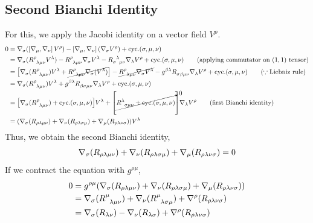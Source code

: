 \subsection{Second Bianchi Identity}
For this, we apply the Jacobi identity on a vector field $V^\rho$. 
\begin{align*}
    0 &= \covd{\sigma}\qty(\comtr{\covd{\mu}}{\covd{\nu}}V^\rho) -\comtr{\covd{\mu}}{\covd{\nu}}(\covd{\sigma}V^\rho) + \mathrm{cyc}. (\sigma, \mu, \nu)\\
    &=\covd{\sigma}(\rie{\rho}{\lambda}{\mu}{\nu}V^\lambda) - \tensor{R}{^\rho _\lambda  _\mu _\nu} \covd{\sigma}V^\lambda - \tensor{R}{_\sigma ^\lambda _{\mu \nu}}\covd{\lambda}V^\rho + \mathrm{cyc}. (\sigma, \mu, \nu) \qquad (\text{applying commutator on $(1,1)$ tensor})\\
    &=\qty[\covd{\sigma}(\rie{\rho}{\lambda}{\mu}{\nu})V^\lambda+\cancel{\rie{\rho}{\lambda}{\mu}{\nu}\covd{\sigma}(V^\lambda)}] - \cancel{\tensor{R}{^\rho _\lambda  _\mu _\nu} \covd{\sigma}V^\lambda} - g^{\beta \lambda}\tensor{R}{_\sigma _\beta _{\mu \nu}}\covd{\lambda}V^\rho + \mathrm{cyc}. (\sigma, \mu, \nu)\qquad(\because  \text{Liebniz rule})\\
    &=\covd{\sigma}(\rie{\rho}{\lambda}{\mu}{\nu})V^\lambda +  g^{\beta \lambda}\tensor{R}{ _\beta _\sigma _{\mu \nu}}\covd{\lambda}V^\rho + \mathrm{cyc}. (\sigma, \mu, \nu)\\
    &=\qty[\covd{\sigma}(\rie{\rho}{\lambda}{\mu}{\nu})+\mathrm{cyc}. (\sigma, \mu, \nu)]V^\lambda + \qty[\cancelto{0}{\tensor{R}{^\lambda _\sigma  _{\mu \nu}} + \mathrm{cyc}. (\sigma, \mu, \nu)}]\covd{\lambda}V^\rho \qquad \text{(first Bianchi identity)}\\
    &=(\covd{\sigma}(R_{{\rho}{\lambda}{\mu}{\nu}}) + \covd{\nu}(R_{{\rho}{\lambda}{\sigma}{\mu}})+\covd{\mu}(R_{{\rho}{\lambda}{\nu}{\sigma}}))V^\lambda
\end{align*}
Thus, we obtain the second Bianchi identity,
$$\nabla_{\sigma}(R_{{\rho}{\lambda}{\mu}{\nu}}) + \nabla_{\nu}(R_{{\rho}{\lambda}{\sigma}{\mu}})+\nabla_{\mu}(R_{{\rho}{\lambda}{\nu}{\sigma}}) = 0$$
If we contract the equation with $g^{\rho \mu}$, 
\begin{align*}
    0&=g^{\rho \mu}(\covd{\sigma}(R_{{\rho}{\lambda}{\mu}{\nu}}) + \covd{\nu}(R_{{\rho}{\lambda}{\sigma}{\mu}})+\covd{\mu}(R_{{\rho}{\lambda}{\nu}{\sigma}}))\\
    &=\covd{\sigma}(\rie{\mu}{\lambda}{\mu}{\nu}) + \covd{\nu}(\rie{\mu}{\lambda}{\sigma}{\mu})+\nabla^\rho(R_{{\rho}{\lambda}{\nu}{\sigma}})\\
    &=\covd{\sigma}(R_{\lambda\nu}) - \covd{\nu}(R_{\lambda \sigma})+\nabla^\rho(R_{{\rho}{\lambda}{\nu}{\sigma}})
\end{align*}
